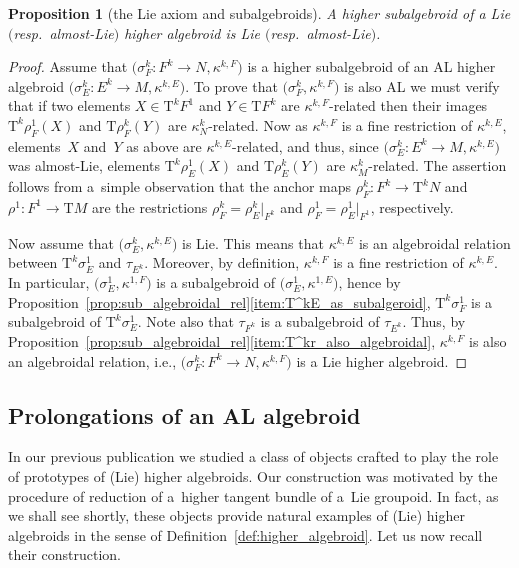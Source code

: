 \documentclass[10pt,a4paper]{amsart}
\newcommand{\ra}{\rightarrow}
\newcommand{\T}{\mathrm{T}} %
\newcommand{\TT}[1]{\mathrm{T}^{#1}} %
\numberwithin{equation}{section}
\newtheorem{prop}[thm]{Proposition}
\theoremstyle{definition}
\begin{document}
 \begin{prop}[the Lie axiom and subalgebroids] \label{prop:sub_HA_is_Lie} A higher subalgebroid of a Lie $($resp.\ almost-Lie$)$ higher algebroid is Lie $($resp.\ almost-Lie$)$.
\end{prop}
\begin{proof} Assume that $\big(\sigma^k_F\colon F^k\ra N, \kappa^{k,F}\big)$ is a higher subalgebroid of an AL higher algebroid $\big(\sigma^k_E\colon E^k\ra M, \kappa^{k,E}\big)$. To prove that $\big(\sigma^k_F, \kappa^{k,F}\big)$ is also AL we must verify that if two elements $X\in \TT{k} F^1$ and $Y\in \T F^k$ are $\kappa^{k,F}$-related then their images $\TT{k} \rho^1_F (X)$ and $\T\rho^k_F(Y)$ are $\kappa^k_{ N}$-related. Now as $\kappa^{k,F}$ is a fine restriction of $\kappa^{k,E}$, elements~$X$ and~$Y$ as above are $\kappa^{k,E}$-related, and thus, since $\big(\sigma^k_E\colon E^k\ra M, \kappa^{k,E}\big)$ was almost-Lie, elements $\TT{k} \rho^1_E (X)$ and $\T\rho^k_E(Y)$ are $\kappa^k_M$-related. The assertion follows from a~simple observation that the anchor { maps} $\rho^k_F\colon F^k\ra \TT{k} N$ and $\rho^1\colon F^1\ra \T M$ are the restrictions $\rho^k_F=\rho^k_E|_{F^k}$ and $\rho^1_F=\rho^1_E|_{F^1}$, respectively.

Now assume that $\big(\sigma^k_E, \kappa^{k,E}\big)$ is Lie. This means that $\kappa^{k,E}$ is an algebroidal relation between $\TT{k}\sigma^1_E$ and $\tau_{E^k}$. Moreover, by definition, $ \kappa^{k,F}$ is a fine restriction of $\kappa^{k,E}$. In particular, $\big(\sigma^1_E, \kappa^{1, F}\big)$ is a subalgebroid of $\big(\sigma^1_E, \kappa^{1, E}\big)$, hence by Proposition~\ref{prop:sub_algebroidal_rel}\eqref{item:T^kE_as_subalgeroid}, $\TT{k}\sigma^1_F$ is a subalgebroid of $\TT{k}\sigma^1_E$. Note also that $\tau_{F^k}$ is a subalgebroid of $\tau_{E^k}$. Thus, by Proposition~\ref{prop:sub_algebroidal_rel}\eqref{item:T^kr_also_algebroidal}, $\kappa^{k,F}$ is also an algebroidal relation, i.e., $\big(\sigma^k_F\colon F^k\ra N, \kappa^{k,F}\big)$ is a Lie higher algebroid.
\end{proof}

\subsection{Prolongations of an AL algebroid}\label{ssec:prolongations}
In our previous publication \cite{MJ_MR_models_high_alg_2015} we studied a class of objects crafted to play the role of prototypes of (Lie) higher algebroids. Our construction was motivated by the procedure of reduction of a~higher tangent bundle of a~Lie groupoid. In fact, as we shall see shortly, these objects provide natural examples of (Lie) higher algebroids in the sense of Definition~\ref{def:higher_algebroid}. Let us now recall their construction.
\end{document}
